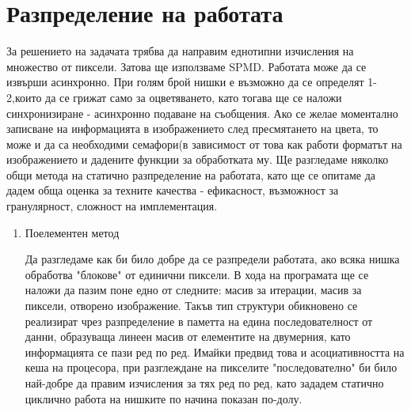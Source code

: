 \section{Разпределение на работата}
\begin{Large}
 За решението на задачата трябва да направим еднотипни изчисления на множество от пиксели. Затова ще използваме SPMD. Работата може да се извърши асинхронно. 
 \newline
 При голям брой нишки е възможно да се определят 1-2,които да се грижат само за оцветяването, като тогава ще се наложи синхронизиране - асинхронно подаване на съобщения. Ако се желае моментално записване на информацията в изображението след пресмятането на цвета, то може и да са необходими семафори(в зависимост от това как работи форматът на изображението и дадените функции за обработката му.
 \newline
 Ще разгледаме няколко общи метода на статично разпределение на работата, като ще се опитаме да дадем обща оценка за техните качества - ефикасност, възможност за гранулярност, сложност на имплементация.
 
 \renewcommand\theenumi {\Roman{enumi}}
 \begin{enumerate}{\theenumi}{}
\item Поелементен метод
\par
Да разгледаме как би било добре да се разпредели работата, ако всяка нишка обработва "блокове" от единични пиксели.
В хода на програмата ще се наложи да пазим поне едно от следните: масив за итерации, масив за пиксели, отворено изображение. Такъв тип структури обикновено се реализират чрез разпределение в паметта на едина последователност от данни, образуваща линеен масив от елементите на двумерния, като информацията се пази ред по ред. Имайки предвид това и асоциативността на кеша на процесора, при разглеждане на пикселите "последователно" би било най-добре да правим изчисления за тях ред по ред, като зададем статично циклично работа на нишките по начина показан по-долу.
 
 \hspace{1.5cm}
\end{enumerate}
\end{Large}
